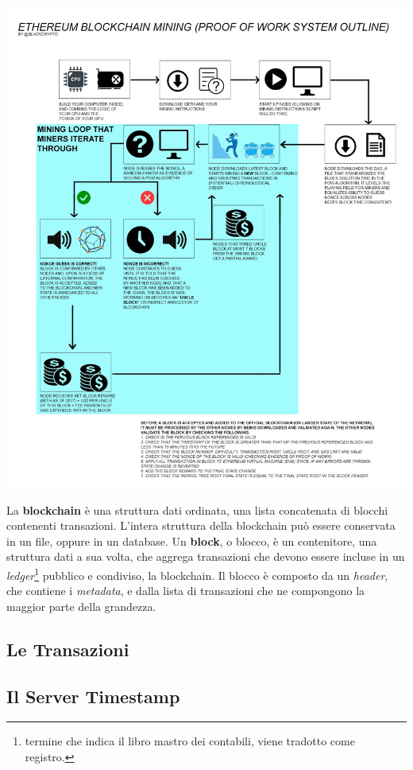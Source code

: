 \documentclass[12pt,a4paper,draft]{article}
\begin{document}
\begin{center}
    \includegraphics[width=\linewidth]{img/pow}
\end{center}
%
La \textbf{blockchain} è una struttura dati ordinata, una lista concatenata di blocchi contenenti transazioni.
L'intera struttura della blockchain può essere conservata in un file, oppure in un database.
Un \textbf{block}, o blocco, è un contenitore, una struttura dati a sua volta, che aggrega transazioni che devono essere incluse in un \textit{ledger}\footnote{termine che indica il libro mastro dei contabili, viene tradotto come registro.} pubblico e condiviso, la blockchain. 
Il blocco è composto da un \textit{header}, che contiene i \textit{metadata}, e dalla lista di transazioni che ne compongono la maggior parte della grandezza.
\subsection{Le Transazioni}
%
%
\subsection{Il Server Timestamp}
%
%
\end{document}
